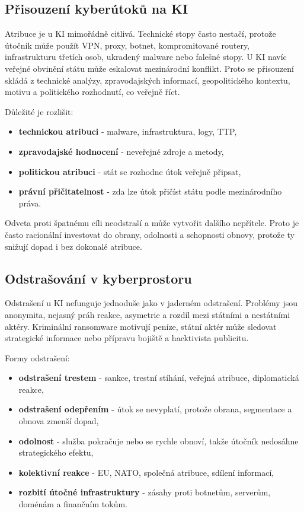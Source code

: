\documentclass[11pt,a4paper]{article}
\begin{document}
\subsection*{Přisouzení kyberútoků na KI}
Atribuce je u KI mimořádně citlivá. Technické stopy často nestačí, protože útočník může použít VPN, proxy, botnet, kompromitované routery, infrastrukturu třetích osob, ukradený malware nebo falešné stopy. U KI navíc veřejné obvinění státu může eskalovat mezinárodní konflikt. Proto se přisouzení skládá z technické analýzy, zpravodajských informací, geopolitického kontextu, motivu a politického rozhodnutí, co veřejně říct.

Důležité je rozlišit:
\begin{itemize}
  \item \textbf{technickou atribuci} - malware, infrastruktura, logy, TTP,
  \item \textbf{zpravodajské hodnocení} - neveřejné zdroje a metody,
  \item \textbf{politickou atribuci} - stát se rozhodne útok veřejně připsat,
  \item \textbf{právní přičitatelnost} - zda lze útok přičíst státu podle mezinárodního práva.
\end{itemize}
Odveta proti špatnému cíli neodstraší a může vytvořit dalšího nepřítele. Proto je často racionální investovat do obrany, odolnosti a schopnosti obnovy, protože ty snižují dopad i bez dokonalé atribuce.

\subsection*{Odstrašování v kyberprostoru}
Odstrašení u KI nefunguje jednoduše jako v jaderném odstrašení. Problémy jsou anonymita, nejasný práh reakce, asymetrie a rozdíl mezi státními a nestátními aktéry. Kriminální ransomware motivují peníze, státní aktér může sledovat strategické informace nebo přípravu bojiště a hacktivista publicitu.

Formy odstrašení:
\begin{itemize}
  \item \textbf{odstrašení trestem} - sankce, trestní stíhání, veřejná atribuce, diplomatická reakce,
  \item \textbf{odstrašení odepřením} - útok se nevyplatí, protože obrana, segmentace a obnova zmenší dopad,
  \item \textbf{odolnost} - služba pokračuje nebo se rychle obnoví, takže útočník nedosáhne strategického efektu,
  \item \textbf{kolektivní reakce} - EU, NATO, společná atribuce, sdílení informací,
  \item \textbf{rozbití útočné infrastruktury} - zásahy proti botnetům, serverům, doménám a finančním tokům.
\end{itemize}
\end{document}

